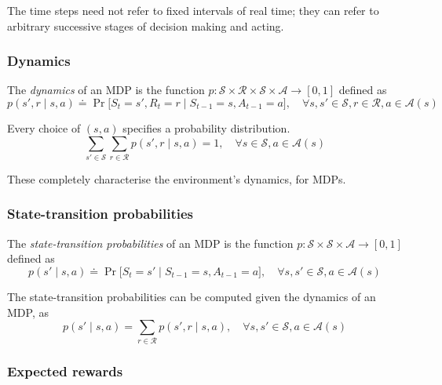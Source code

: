 The time steps need not refer to fixed intervals of real time; they can refer to arbitrary successive stages of decision making and acting.

\subsubsection{Dynamics}

The \textit{dynamics} of an MDP is the function \( p: \mathcal{S} \times \mathcal{R} \times \mathcal{S} \times \mathcal{A} \to [0, 1] \) defined as
\begin{equation}
    p(s', r \mid s, a) \doteq \Pr \big[ S_{t} = s', R_{t} = r \mid S_{t-1} = s, A_{t-1} = a \big]
    , \quad \forall s, s' \in \mathcal{S}, r \in \mathcal{R}, a \in \mathcal{A}(s)
\end{equation}

Every choice of \( (s, a) \) specifies a probability distribution.
\begin{equation}
    \sum_{s' \in \mathcal{S}} \sum_{r \in \mathcal{R}} p(s', r \mid s, a) = 1
    , \quad \forall s \in \mathcal{S}, a \in \mathcal{A}(s)
\end{equation}

These completely characterise the environment's dynamics, for MDPs.

\subsubsection{State-transition probabilities}

The \textit{state-transition probabilities} of an MDP is the function \( p: \mathcal{S} \times \mathcal{S} \times \mathcal{A} \to [0, 1] \) defined as
\begin{equation}
    p(s' \mid s, a) \doteq \Pr \big[ S_{t} = s' \mid S_{t-1} = s, A_{t-1} = a \big]
    , \quad \forall s, s' \in \mathcal{S}, a \in \mathcal{A}(s)
\end{equation}

The state-transition probabilities can be computed given the dynamics of an MDP, as
\begin{equation}
    p(s' \mid s, a) = \sum_{r \in \mathcal{R}} p(s', r \mid s, a)
    , \quad \forall s, s' \in \mathcal{S}, a \in \mathcal{A}(s)
\end{equation}

\subsubsection{Expected rewards}


